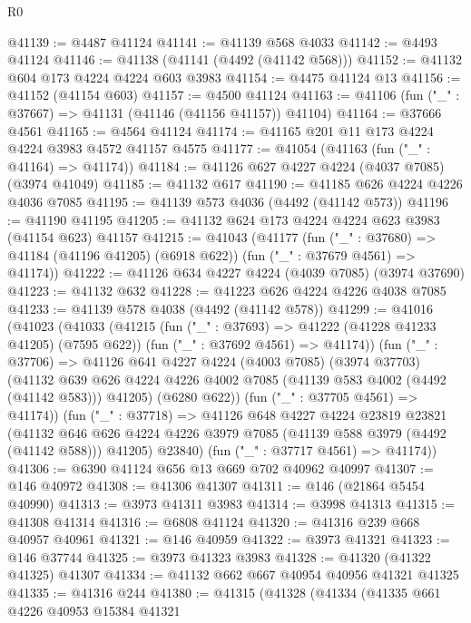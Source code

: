 \begin{lexlean}{R0}
\begin{coremodule}
@41139 := @4487 @41124
@41141 := @41139 @568 @4033
@41142 := @4493 @41124
@41146 := @41138 (@41141 (@4492 (@41142 @568)))
@41152 := @41132 @604 @173 @4224 @4224 @603 @3983
@41154 := @4475 @41124 @13
@41156 := @41152 (@41154 @603)
@41157 := @4500 @41124
@41163 := @41106 (fun ("_" : @37667) => @41131 (@41146 (@41156 @41157)) @41104)
@41164 := @37666 @4561
@41165 := @4564 @41124
@41174 := @41165 @201 @11 @173 @4224 @4224 @3983 @4572 @41157 @4575
@41177 := @41054 (@41163 (fun ("_" : @41164) => @41174))
@41184 := @41126 @627 @4227 @4224 (@4037 @7085) (@3974 @41049)
@41185 := @41132 @617
@41190 := @41185 @626 @4224 @4226 @4036 @7085
@41195 := @41139 @573 @4036 (@4492 (@41142 @573))
@41196 := @41190 @41195
@41205 := @41132 @624 @173 @4224 @4224 @623 @3983 (@41154 @623) @41157
@41215 := @41043
    (@41177
      (fun ("_" : @37680) => @41184 (@41196 @41205) (@6918 @622))
      (fun ("_" : @37679 @4561) => @41174))
@41222 := @41126 @634 @4227 @4224 (@4039 @7085) (@3974 @37690)
@41223 := @41132 @632
@41228 := @41223 @626 @4224 @4226 @4038 @7085
@41233 := @41139 @578 @4038 (@4492 (@41142 @578))
@41299 := @41016
    (@41023
      (@41033
        (@41215
          (fun ("_" : @37693) => @41222 (@41228 @41233 @41205) (@7595 @622))
          (fun ("_" : @37692 @4561) => @41174))
        (fun ("_" : @37706) =>
        @41126
          @641
          @4227
          @4224
          (@4003 @7085)
          (@3974 @37703)
          (@41132
            @639
            @626
            @4224
            @4226
            @4002
            @7085
            (@41139 @583 @4002 (@4492 (@41142 @583)))
            @41205)
          (@6280 @622))
        (fun ("_" : @37705 @4561) => @41174))
      (fun ("_" : @37718) =>
      @41126
        @648
        @4227
        @4224
        @23819
        @23821
        (@41132 @646 @626 @4224 @4226 @3979 @7085 (@41139 @588 @3979 (@4492 (@41142 @588))) @41205)
        @23840)
      (fun ("_" : @37717 @4561) => @41174))
@41306 := @6390 @41124 @656 @13 @669 @702 @40962 @40997
@41307 := @146 @40972
@41308 := @41306 @41307
@41311 := @146 (@21864 @5454 @40990)
@41313 := @3973 @41311 @3983
@41314 := @3998 @41313
@41315 := @41308 @41314
@41316 := @6808 @41124
@41320 := @41316 @239 @668 @40957 @40961
@41321 := @146 @40959
@41322 := @3973 @41321
@41323 := @146 @37744
@41325 := @3973 @41323 @3983
@41328 := @41320 (@41322 @41325) @41307
@41334 := @41132 @662 @667 @40954 @40956 @41321 @41325
@41335 := @41316 @244
@41380 := @41315
    (@41328
      (@41334
        (@41335
          @661
          @4226
          @40953
          @15384
          @41321

\end{coremodule}
\end{lexlean}

